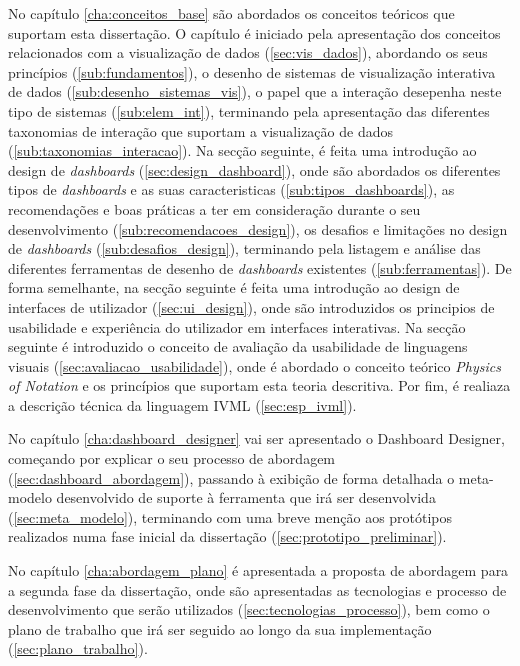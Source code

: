 No capítulo \ref{cha:conceitos_base} são abordados os conceitos teóricos que suportam esta dissertação. O capítulo é iniciado pela apresentação dos conceitos relacionados com a visualização de dados (\ref{sec:vis_dados}), abordando os seus princípios (\ref{sub:fundamentos}), o desenho de sistemas de visualização interativa de dados (\ref{sub:desenho_sistemas_vis}), o papel que a interação desepenha neste tipo de sistemas (\ref{sub:elem_int}), terminando pela apresentação das diferentes taxonomias de interação que suportam a visualização de dados (\ref{sub:taxonomias_interacao}). Na secção seguinte, é feita uma introdução ao design de \textit{dashboards} (\ref{sec:design_dashboard}), onde são abordados os diferentes tipos de \textit{dashboards} e as suas caracteristicas (\ref{sub:tipos_dashboards}), as recomendações e boas práticas a ter em consideração durante o seu desenvolvimento (\ref{sub:recomendacoes_design}), os desafios e limitações no design de \textit{dashboards} (\ref{sub:desafios_design}), terminando pela listagem e análise das diferentes ferramentas de desenho de \textit{dashboards} existentes (\ref{sub:ferramentas}). De forma semelhante, na secção seguinte é feita uma introdução ao design de interfaces de utilizador (\ref{sec:ui_design}), onde são introduzidos os principios de usabilidade e experiência do utilizador em interfaces interativas. Na secção seguinte é introduzido o conceito de avaliação da usabilidade de linguagens visuais (\ref{sec:avaliacao_usabilidade}), onde é abordado o conceito teórico \textit{Physics of Notation} e os princípios que suportam esta teoria descritiva. Por fim, é realiaza a descrição técnica da linguagem IVML (\ref{sec:esp_ivml}).

No capítulo \ref{cha:dashboard_designer} vai ser apresentado o Dashboard Designer, começando por explicar o seu processo de abordagem (\ref{sec:dashboard_abordagem}), passando à exibição de forma detalhada o meta-modelo desenvolvido de suporte à ferramenta que irá ser desenvolvida (\ref{sec:meta_modelo}), terminando com uma breve menção aos protótipos realizados numa fase inicial da dissertação (\ref{sec:prototipo_preliminar}).

No capítulo \ref{cha:abordagem_plano} é apresentada a proposta de abordagem para a segunda fase da dissertação, onde são apresentadas as tecnologias e processo de desenvolvimento que serão utilizados (\ref{sec:tecnologias_processo}), bem como o plano de trabalho que irá ser seguido ao longo da sua implementação (\ref{sec:plano_trabalho}). 

